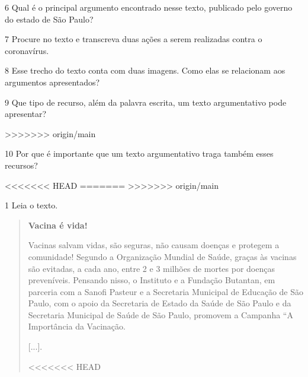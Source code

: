 {\num{6} Qual é o principal argumento encontrado nesse texto, publicado pelo governo do estado de São Paulo?



\num{7} Procure no texto e transcreva duas ações a serem realizadas contra o
coronavírus.



\num{8} Esse trecho do texto conta com duas imagens. Como elas se
relacionam aos argumentos apresentados?


\num{9} Que tipo de recurso, além da palavra escrita, um texto argumentativo
pode apresentar?

>>>>>>> origin/main


\num{10} Por que é importante que um texto argumentativo traga também esses recursos?

<<<<<<< HEAD
=======
>>>>>>> origin/main



\num{1} Leia o texto.

\begin{quote}
\textbf{Vacina é vida!}

Vacinas salvam vidas, são seguras, não causam doenças e protegem a
comunidade! Segundo a Organização Mundial de Saúde, graças às vacinas
são evitadas, a cada ano, entre 2 e 3 milhões de mortes por doenças
preveníveis. Pensando nisso, o Instituto e a Fundação Butantan, em
parceria com a Sanofi Pasteur e a Secretaria Municipal de Educação de
São Paulo, com o apoio da Secretaria de Estado da Saúde de São Paulo e
da Secretaria Municipal de Saúde de São Paulo, promovem a Campanha “A
Importância da Vacinação.

{[}...{]}.

<<<<<<< HEAD
\end{quote}

}

